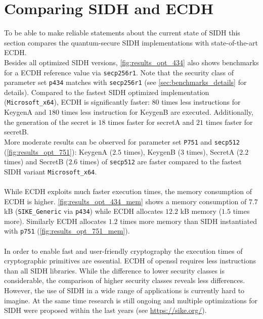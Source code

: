 \section{Comparing \gls{SIDH} and \gls{ECDH}} \label{sec:analysis_effiency_ecdh}

To be able to make reliable statements about the current state of \gls{SIDH} this section compares the quantum-secure \gls{SIDH} implementations with state-of-the-art \gls{ECDH}. \\
Besides all optimized \gls{SIDH} versions, \autoref{fig:results_opt_434} also shows benchmarks for a \gls{ECDH} reference value via \texttt{secp256r1}. Note that the security class of parameter set \texttt{p434} matches with \texttt{secp256r1} (see \autoref{sec:benchmarks_details} for details). Compared to the fastest \gls{SIDH} optimized implementation (\texttt{Microsoft\_x64}), \gls{ECDH} is significantly faster: $80$ times less instructions for KeygenA and $180$ times less instruction for KeygenB are executed. Additionally, the generation of the secret is $18$ times faster for secretA and $21$ times faster for secretB.\\
More moderate results can be observed for parameter set \texttt{P751} and \texttt{secp512} (\autoref{fig:results_opt_751}): KeygenA ($2.5$ times),  KeygenB ($3$ times), SecretA ($2.2$ times) and SecretB ($2.6$ times) of \texttt{secp512} are faster compared to the fastest \gls{SIDH} variant \texttt{Microsoft\_x64}.
\\\\
While \gls{ECDH} exploits much faster execution times, the memory consumption of \gls{ECDH} is higher.  \autoref{fig:results_opt_434_mem} shows a memory consumption of $7.7$ \gls{kB} (\texttt{SIKE\_Generic} via \texttt{p434}) while \gls{ECDH} allocates $12.2$ \gls{kB} memory ($1.5$ times more). Similarly \gls{ECDH} allocates $1.2$ times more memory than \gls{SIDH} instantiated with \texttt{p751} (\autoref{fig:results_opt_751_mem}).
\\\\
In order to enable fast and user-friendly cryptography the execution times of cryptographic primitives are essential. \gls{ECDH} of \gls{openssl} requires less instructions than all \gls{SIDH} libraries. While the difference to lower security classes is considerable, the comparison of higher security classes reveals less differences. However, the use of \gls{SIDH} in a wide range of applications is currently hard to imagine. At the same time research is still ongoing and multiple optimizations for \gls{SIDH} were proposed within the last years (see \url{https://sike.org/}). 
